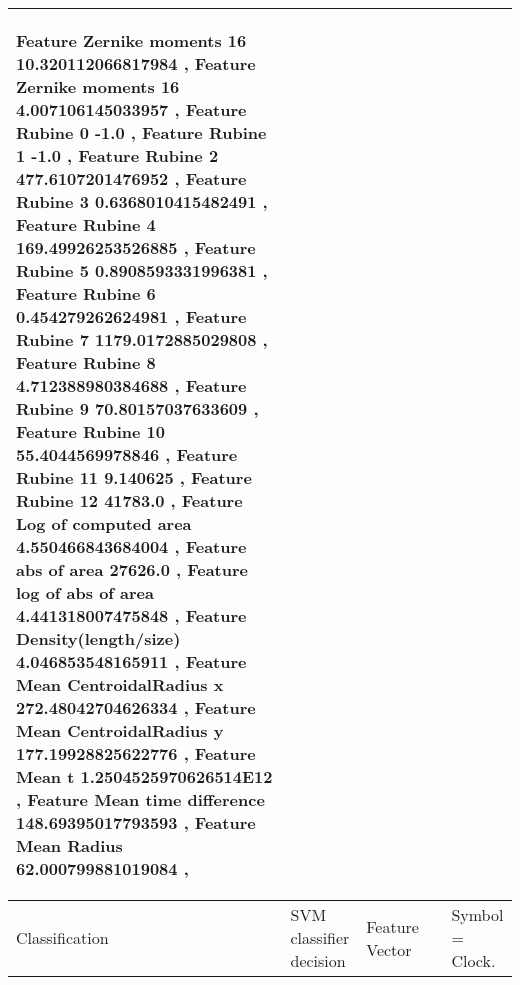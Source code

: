 \begin{landscape}
\begin{scriptsize}
\begin{longtable}{|p{2cm}|p{2cm}|p{2cm}|p{2cm}|p{13cm}|}
\begin{scriptsize}
Feature Zernike moments 16 10.320112066817984   ,    Feature Zernike moments 16 4.007106145033957   ,    Feature Rubine 0 -1.0   ,    Feature Rubine 1 -1.0   ,    Feature Rubine 2 477.6107201476952   ,    Feature Rubine 3 0.6368010415482491   ,    Feature Rubine 4 169.49926253526885   ,    Feature Rubine 5 0.8908593331996381   ,    Feature Rubine 6 0.454279262624981   ,    Feature Rubine 7 1179.0172885029808   ,    Feature Rubine 8 4.712388980384688   ,    Feature Rubine 9 70.80157037633609   ,    Feature Rubine 10 55.4044569978846   ,    Feature Rubine 11 9.140625   ,    Feature Rubine 12 41783.0   ,    Feature  Log of computed area 4.550466843684004   ,    Feature  abs of area 27626.0   ,    Feature log of  abs of area 4.441318007475848   ,    Feature  Density(length/size)  4.046853548165911   ,    Feature Mean CentroidalRadius x 272.48042704626334   ,    Feature Mean CentroidalRadius y 177.19928825622776   ,    Feature Mean t 1.2504525970626514E12   ,    Feature Mean time difference 148.69395017793593   ,    Feature Mean Radius 62.000799881019084   ,  
   \end{scriptsize} \\ \hline
   Classification  & SVM classifier decision & Feature Vector  &  & 
   Symbol = Clock.  
 
 \\ \hline
   
 		\end{longtable}


\end{scriptsize}

\end{landscape}